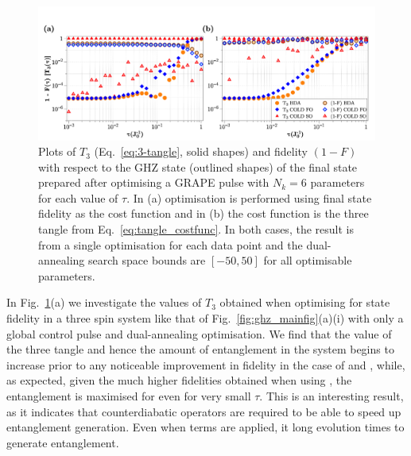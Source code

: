 \begin{figure}[t]
    \centering
    \includegraphics[width=\linewidth]{images/tangle_plots.png} \caption[Preparing 3-spin GHZ states using the 3-tangle as a metric.]{Plots of $T_3$ (Eq.~\eqref{eq:3-tangle}, solid shapes) and fidelity $(1 - F)$ with respect to the GHZ state (outlined shapes) of the final state prepared after optimising a GRAPE pulse with $N_k = 6$ parameters for each value of $\tau$. In (a) optimisation is performed using final state fidelity as the cost function and in (b) the cost function is the three tangle from Eq.~\eqref{eq:tangle_costfunc}. In both cases, the result is from a single optimisation for each data point and the dual-annealing search space bounds are $[-50,50]$ for all optimisable parameters.}\label{fig:tangle_v_fidelity}
\end{figure}

In Fig.~\ref{fig:tangle_v_fidelity}(a) we investigate the values of $T_3$ obtained when optimising for state fidelity in a three spin system like that of Fig.~\ref{fig:ghz_mainfig}(a)(i) with only a global control pulse and dual-annealing optimisation. We find that the value of the three tangle and hence the amount of entanglement in the system begins to increase prior to any noticeable improvement in fidelity in the case of  and  , while, as expected, given the much higher fidelities obtained when using  , the entanglement is maximised for even for very small $\tau$. This is an interesting result, as it indicates that  counterdiabatic operators are required to be able to speed up entanglement generation. Even when  terms are applied, it long evolution times to generate entanglement.

